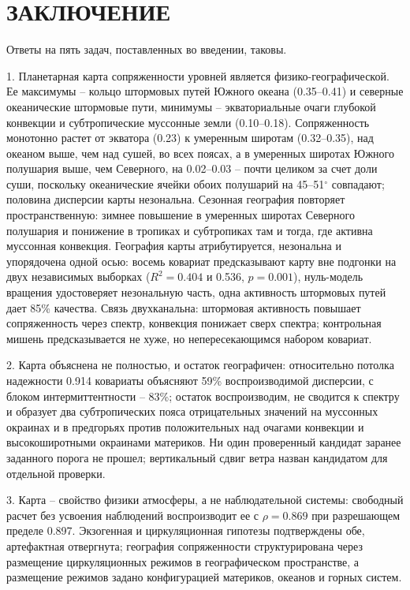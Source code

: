 \documentclass[12pt,a4paper]{article}
\begin{document}
\section{ЗАКЛЮЧЕНИЕ}

Ответы на пять задач, поставленных во введении, таковы.

1. Планетарная карта сопряженности уровней является физико-географической. Ее максимумы -- кольцо штормовых путей Южного океана (0.35--0.41) и северные океанические штормовые пути, минимумы -- экваториальные очаги глубокой конвекции и субтропические муссонные земли (0.10--0.18). Сопряженность монотонно растет от экватора (0.23) к умеренным широтам (0.32--0.35), над океаном выше, чем над сушей, во всех поясах, а в умеренных широтах Южного полушария выше, чем Северного, на 0.02--0.03 -- почти целиком за счет доли суши, поскольку океанические ячейки обоих полушарий на 45--51$^\circ$ совпадают; половина дисперсии карты незональна. Сезонная география повторяет пространственную: зимнее повышение в умеренных широтах Северного полушария и понижение в тропиках и субтропиках там и тогда, где активна муссонная конвекция. География карты атрибутируется, незональна и упорядочена одной осью: восемь ковариат предсказывают карту вне подгонки на двух независимых выборках ($R^2 = 0.404$ и 0.536, $p = 0.001$), нуль-модель вращения удостоверяет незональную часть, одна активность штормовых путей дает 85\% качества. Связь двухканальна: штормовая активность повышает сопряженность через спектр, конвекция понижает сверх спектра; контрольная мишень предсказывается не хуже, но непересекающимся набором ковариат.

2. Карта объяснена не полностью, и остаток географичен: относительно потолка надежности 0.914 ковариаты объясняют 59\% воспроизводимой дисперсии, с блоком интермиттентности -- 83\%; остаток воспроизводим, не сводится к спектру и образует два субтропических пояса отрицательных значений на муссонных окраинах и в предгорьях против положительных над очагами конвекции и высокоширотными окраинами материков. Ни один проверенный кандидат заранее заданного порога не прошел; вертикальный сдвиг ветра назван кандидатом для отдельной проверки.

3. Карта -- свойство физики атмосферы, а не наблюдательной системы: свободный расчет без усвоения наблюдений воспроизводит ее с $\rho = 0.869$ при разрешающем пределе 0.897. Экзогенная и циркуляционная гипотезы подтверждены обе, артефактная отвергнута; география сопряженности структурирована через размещение циркуляционных режимов в географическом пространстве, а размещение режимов задано конфигурацией материков, океанов и горных систем.
\end{document}
